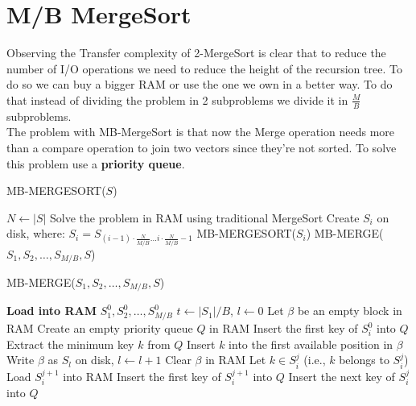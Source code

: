 \documentclass{report}
\begin{document}
\section{M/B MergeSort}
Observing the Transfer complexity of 2-MergeSort is clear that to reduce the number of I/O operations we need to reduce the height of the recursion tree. To do so we can buy a bigger RAM or use the one we own in a better way. To do that instead of dividing the problem in 2 subproblems we divide it in \(\frac{M}{B}\) subproblems. 
\\The problem with MB-MergeSort is that now the Merge operation needs more than a compare operation to join two vectors since they're not sorted. To solve this problem use a \textbf{priority queue}.
\begin{algorithm}
    \caption{MB-MERGESORT(\(S\))}
    \begin{algorithmic}[1]
    \State \(N \gets |S|\)
        \State Solve the problem in RAM using traditional MergeSort
    \Else
            \State Create \(S_i\) on disk, where:
            \State \(S_i = S_{(i-1) \cdot \frac{N}{M/B} \dots i \cdot \frac{N}{M/B} - 1}\)
            \State \textsc{MB-MERGESORT}(\(S_i\))
        \EndFor
        \State \textsc{MB-MERGE}(\(S_1, S_2, \dots, S_{M/B}, S\))
    \EndIf
    \end{algorithmic}
\end{algorithm}
\begin{algorithm}
    \caption{MB-MERGE(\(S_1, S_2, \dots, S_{M/B}, S\))}
    \begin{algorithmic}[1]
    \State \textbf{Load into RAM} \(S_1^0, S_2^0, \dots, S_{M/B}^0\)
    \State \(t \gets |S_1|/B\), \(l \gets 0\)
    \State Let \(\beta\) be an empty block in RAM
    \State Create an empty priority queue \(Q\) in RAM
        \State Insert the first key of \(S_i^0\) into \(Q\)
    \EndFor
        \State Extract the minimum key \(k\) from \(Q\)
        \State Insert \(k\) into the first available position in \(\beta\)
            \State Write \(\beta\) as \(S_l\) on disk, \(l \gets l + 1\)
            \State Clear \(\beta\) in RAM
        \EndIf
        \State Let \(k \in S^j_i\) (i.e., \(k\) belongs to \(S^j_i\))
                \State Load \(S^{j+1}_i\) into RAM
                \State Insert the first key of \(S^{j+1}_i\) into \(Q\)
            \EndIf
        \Else
            \State Insert the next key of \(S^j_i\) into \(Q\)
        \EndIf
    \EndWhile
    \end{algorithmic}
\end{algorithm}
\end{document}
